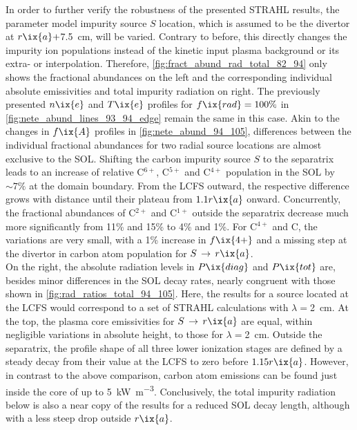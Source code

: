                 In order to further verify the robustness of the presented STRAHL results, the parameter model impurity source $S$ location, which is assumed to be the divertor at $r\ix{a}+$\SI{7.5}{\centi\meter}, will be varied. Contrary to before, this directly changes the impurity ion populations instead of the kinetic input plasma background or its extra- or interpolation. Therefore, \cref{fig:fract_abund_rad_total_82_94} only shows the fractional abundances on the left and the corresponding individual absolute emissivities and total impurity radiation on right. The previously presented $n\ix{e}$ and $T\ix{e}$ profiles for $f\ix{rad}=100\%$ in \cref{fig:nete_abund_lines_93_94_edge} remain the same in this case. Akin to the changes in $f\ix{A}$ profiles in \cref{fig:nete_abund_94_105}, differences between the individual fractional abundances for two radial source locations are almost exclusive to the SOL. Shifting the carbon impurity source $S$ to the separatrix leads to an increase of relative C$^{6+}$, C$^{5+}$ and C$^{4+}$ population in the SOL by $\sim7\%$ at the domain boundary. From the LCFS outward, the respective difference grows with distance until their plateau from $1.1r\ix{a}$ onward. Concurrently, the fractional abundances of C$^{2+}$ and C$^{1+}$ outside the separatrix decrease much more significantly from 11\% and 15\% to 4\% and 1\%. For C$^{4+}$ and C, the variations are very small, with a 1\% increase in $f\ix{4+}$ and a missing step at the divertor in carbon atom population for $S\,\rightarrow\,r\ix{a}$.\\%
                On the right, the absolute radiation levels in $P\ix{diag}$ and $P\ix{tot}$ are, besides minor differences in the SOL decay rates, nearly congruent with those shown in \cref{fig:rad_ratios_total_94_105}. Here, the results for a source located at the LCFS would correspond to a set of STRAHL calculations with $\lambda=$\SI{2}{\centi\meter}. At the top, the plasma core emissivities for $S\,\rightarrow\,r\ix{a}$ are equal, within negligible variations in absolute height, to those for $\lambda=$\SI{2}{\centi\meter}. Outside the separatrix, the profile shape of all three lower ionization stages are defined by a steady decay from their value at the LCFS to zero before $1.15r\ix{a}$. However, in contrast to the above comparison, carbon atom emissions can be found just inside the core of up to \SI{5}{\kilo\watt\per\cubic\meter}. Conclusively, the total impurity radiation below is also a near copy of the results for a reduced SOL decay length, although with a less steep drop outside $r\ix{a}$.\\%
